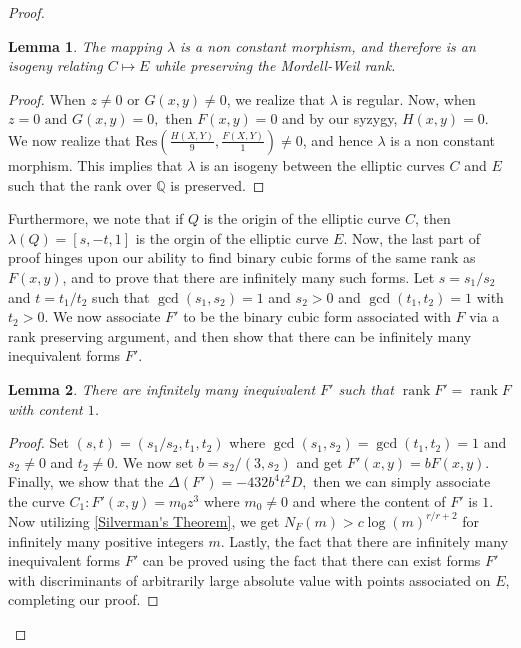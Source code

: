 \documentclass[10pt,a4paper]{amsart}
\newtheorem{lemma}{Lemma}
\renewcommand{\qedsymbol}{$\blacksquare$}
\begin{document}
\begin{proof}
\begin{lemma}
    The mapping $\lambda$ is a non constant morphism, and therefore is an isogeny relating $C \mapsto E$ while preserving the Mordell-Weil rank. 
\end{lemma}
\begin{proof}
    When $z \neq 0 \text{ or } G(x,y) \neq 0$, we realize that $\lambda$ is regular. Now, when $z = 0 \text{ and } G(x,y) = 0,$  then $F(x,y) =0 $ and by our syzygy, $H(x,y) = 0$. We now realize that $\mathrm{Res}( \frac{H(X, Y)}{9}, \frac{F(X,Y)}{1}) \neq 0$, and hence $\lambda$ is a non constant morphism. This implies that $\lambda$ is an isogeny between the elliptic curves $C$ and $E$ such that the rank over $\mathbb{Q}$ is preserved. 
    \end{proof}
Furthermore, we note that if $Q$ is the origin of the elliptic curve $C$, then $\lambda(Q) = [s, -t, 1]$ is the orgin of the elliptic curve $E$. Now, the last part of proof hinges upon our ability to find binary cubic forms of the same rank as $F(x,y)$, and to prove that there are infinitely many such forms. Let $s = s_1/s_2$ and $t = t_1/t_2$ such that $\gcd(s_1,s_2) = 1$ and $s_2 > 0$ and $\gcd(t_1, t_2) = 1$ with $t_2 > 0$. We now associate $F'$ to be the binary cubic form associated with $F$ via a rank preserving argument, and then show that there can be infinitely many inequivalent forms $F'$. 
\begin{lemma}
    There are infinitely many inequivalent $F'$ such that $\operatorname{rank}F' = \operatorname{rank}F$ with content $1$.
\end{lemma}
\begin{proof}\renewcommand{\qedsymbol}{}

Set $(s,t) = (s_1/s_2, t_1,t_2)$ where $\gcd(s_1,s_2) = \gcd(t_1,t_2) = 1$ and $s_2 \neq 0$ and $t_2 \neq 0.$ We now set $b = s_2/(3,s_2)$ and get $F'(x,y) = b F(x,y).$ Finally, we show that the $\Delta(F') = -432b^4 t^2D, $ then we can simply associate the curve $C_1: F'(x,y) = m_0 z^3$ where $m_0 \neq 0$ and where the content of $F'$ is $1.$ Now utilizing \ref{Silverman's Theorem}, we get $N_{F} (m) > c \log(m)^{r/r+2}$ for infinitely many positive integers $m.$ Lastly, the fact that there are infinitely many inequivalent forms $F'$ can be proved using the fact that there can exist forms $F'$ with discriminants of arbitrarily large absolute value with points associated on $E$, completing our proof.
\end{proof}
\end{proof}
\end{document}
